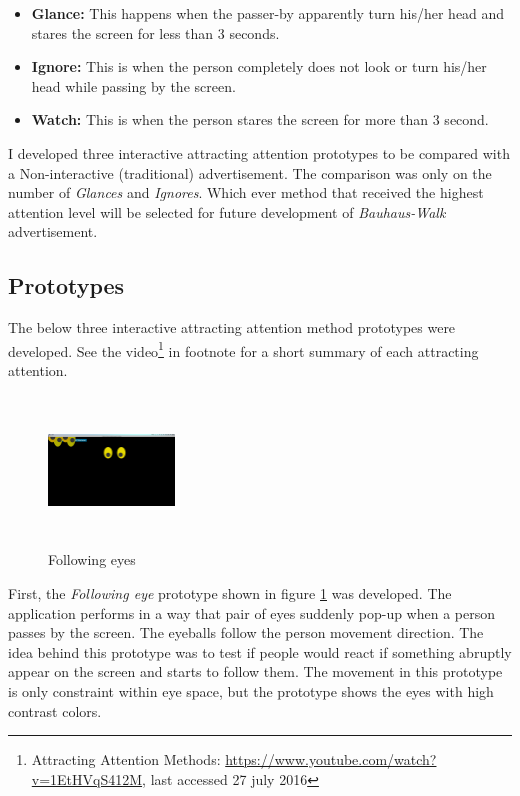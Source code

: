 \begin{itemize}
\item \textbf{Glance: } This happens when the passer-by apparently turn his/her head and stares the screen for less than 3 seconds.
\item \textbf{Ignore: } This is when the person completely does not look or turn his/her head while passing by the screen.
\item \textbf{Watch: } This is when the person stares the screen for more than 3 second.
\end{itemize}

I developed three interactive attracting attention prototypes to be compared with a Non-interactive (traditional) advertisement. The comparison was only on the number of \emph{Glances} and \emph{Ignores}. Which ever method that received the highest attention level will be selected for future development of \emph{Bauhaus-Walk} advertisement. 


\subsection{Prototypes}
The below three interactive attracting attention method prototypes were developed. See the video\footnote{Attracting Attention Methods: \url{https://www.youtube.com/watch?v=1EtHVqS412M}, last accessed 27 july 2016} in footnote for a short summary of each attracting attention.
 
\begin{figure}
  \vspace{-30pt}
  \begin{center}
    \includegraphics[width=0.3\textwidth,height=40mm]{Figures/3/eyes}
  \end{center}
  \vspace{-20pt}
  \caption{Following eyes}          
  \label{fig:Attraction_eye}
  \vspace{-20pt}
\end{figure} 
First, the \emph{Following eye} prototype shown in figure \ref{fig:Attraction_eye} was developed. The application performs in a way that pair of eyes suddenly pop-up when a person passes by the screen. The eyeballs follow the person movement direction. The idea behind this prototype was to test if people would react if something abruptly appear on the screen and starts to follow them. The movement in this prototype is only constraint within eye space, but the prototype shows the eyes with high contrast colors. 
\break
\break


